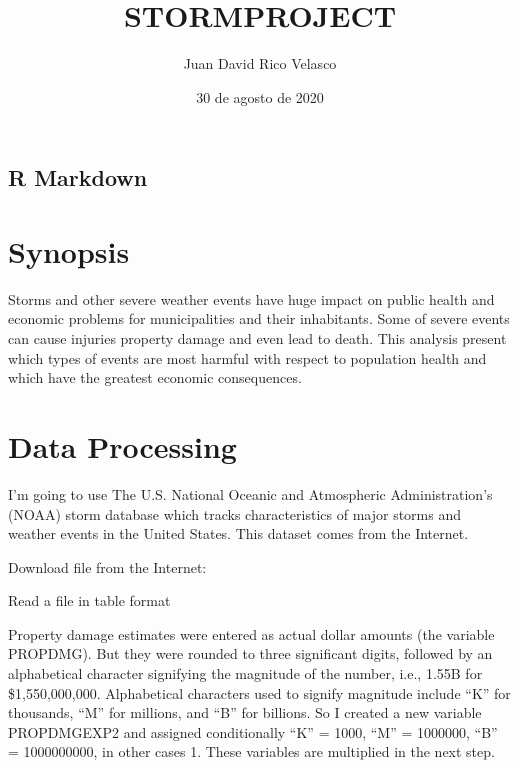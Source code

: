 \documentclass[]{article}
\title{STORMPROJECT}
\author{Juan David Rico Velasco}
\date{30 de agosto de 2020}
\newenvironment{Shaded}{\begin{snugshade}}{\end{snugshade}}
\newcommand{\KeywordTok}[1]{\textcolor[rgb]{0.13,0.29,0.53}{\textbf{#1}}}
\newcommand{\DataTypeTok}[1]{\textcolor[rgb]{0.13,0.29,0.53}{#1}}
\newcommand{\StringTok}[1]{\textcolor[rgb]{0.31,0.60,0.02}{#1}}
\newcommand{\NormalTok}[1]{#1}
\begin{document}
\maketitle

\subsection{R Markdown}\label{r-markdown}

\section{Synopsis}\label{synopsis}

Storms and other severe weather events have huge impact on public health
and economic problems for municipalities and their inhabitants. Some of
severe events can cause injuries property damage and even lead to death.
This analysis present which types of events are most harmful with
respect to population health and which have the greatest economic
consequences.

\section{Data Processing}\label{data-processing}

I'm going to use The U.S. National Oceanic and Atmospheric
Administration's (NOAA) storm database which tracks characteristics of
major storms and weather events in the United States. This dataset comes
from the Internet.

Download file from the Internet:

\begin{Shaded}
\end{Shaded}

Read a file in table format

Property damage estimates were entered as actual dollar amounts (the
variable PROPDMG). But they were rounded to three significant digits,
followed by an alphabetical character signifying the magnitude of the
number, i.e., 1.55B for \$1,550,000,000. Alphabetical characters used to
signify magnitude include ``K'' for thousands, ``M'' for millions, and
``B'' for billions. So I created a new variable PROPDMGEXP2 and assigned
conditionally ``K'' = 1000, ``M'' = 1000000, ``B'' = 1000000000, in
other cases 1. These variables are multiplied in the next step.
\end{document}
